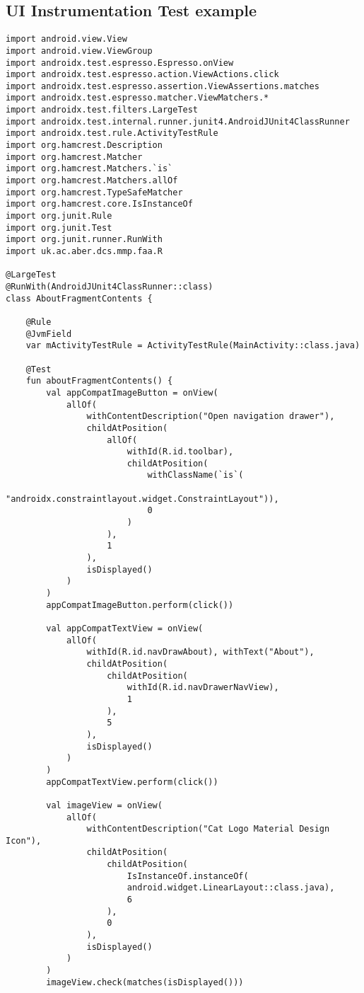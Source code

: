 \subsection{UI Instrumentation Test example} \label{UIINSTTESTEXAMPLE}
\begin{verbatim}
import android.view.View
import android.view.ViewGroup
import androidx.test.espresso.Espresso.onView
import androidx.test.espresso.action.ViewActions.click
import androidx.test.espresso.assertion.ViewAssertions.matches
import androidx.test.espresso.matcher.ViewMatchers.*
import androidx.test.filters.LargeTest
import androidx.test.internal.runner.junit4.AndroidJUnit4ClassRunner
import androidx.test.rule.ActivityTestRule
import org.hamcrest.Description
import org.hamcrest.Matcher
import org.hamcrest.Matchers.`is`
import org.hamcrest.Matchers.allOf
import org.hamcrest.TypeSafeMatcher
import org.hamcrest.core.IsInstanceOf
import org.junit.Rule
import org.junit.Test
import org.junit.runner.RunWith
import uk.ac.aber.dcs.mmp.faa.R

@LargeTest
@RunWith(AndroidJUnit4ClassRunner::class)
class AboutFragmentContents {

    @Rule
    @JvmField
    var mActivityTestRule = ActivityTestRule(MainActivity::class.java)

    @Test
    fun aboutFragmentContents() {
        val appCompatImageButton = onView(
            allOf(
                withContentDescription("Open navigation drawer"),
                childAtPosition(
                    allOf(
                        withId(R.id.toolbar),
                        childAtPosition(
                            withClassName(`is`(
                            "androidx.constraintlayout.widget.ConstraintLayout")),
                            0
                        )
                    ),
                    1
                ),
                isDisplayed()
            )
        )
        appCompatImageButton.perform(click())

        val appCompatTextView = onView(
            allOf(
                withId(R.id.navDrawAbout), withText("About"),
                childAtPosition(
                    childAtPosition(
                        withId(R.id.navDrawerNavView),
                        1
                    ),
                    5
                ),
                isDisplayed()
            )
        )
        appCompatTextView.perform(click())

        val imageView = onView(
            allOf(
                withContentDescription("Cat Logo Material Design Icon"),
                childAtPosition(
                    childAtPosition(
                        IsInstanceOf.instanceOf(
                        android.widget.LinearLayout::class.java),
                        6
                    ),
                    0
                ),
                isDisplayed()
            )
        )
        imageView.check(matches(isDisplayed()))


\end{verbatim}
